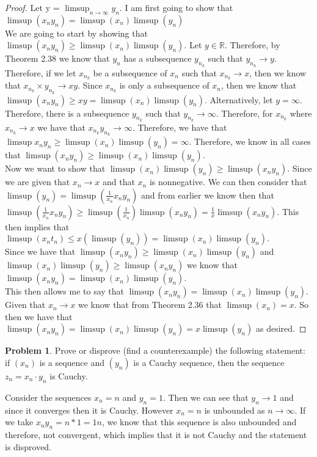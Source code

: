 \documentclass[11pt]{article}
\theoremstyle{definition}
\newtheorem{problem}{Problem}
\newcommand{\R}{\mathbb{R}}
\begin{document}
\begin{proof}
Let y = $\limsup_{n\to \infty}y_n$. I am first going to show that $\limsup(x_ny_n) = \limsup(x_n)\limsup(y_n)$\\
We are going to start by showing that $\limsup(x_ny_n) \geq \limsup(x_n) \limsup(y_n).$ Let $y \in \R$. Therefore, by Theorem 2.38 we know that $y_n$ has a subsequence $y_{n_k}$ such that $y_{n_k} \to y$. Therefore, if we let $x_{n_k}$ be a subsequence of $x_n$ such that $x_{n_k} \to x$, then we know that $x_{n_k}\times y_{n_k} \to xy$. Since $x_{n_k}$ is only a subsequence of $x_n$, then we know that $\limsup(x_ny_n) \geq xy = \limsup (x_n)\limsup(y_n)$. Alternatively, let $y = \infty.$ Therefore, there is a subsequence $y_{n_k}$ such that $y_{n_k} \to \infty.$ Therefore, for $x_{n_k}$ where $x_{n_k}\to x$ we have that $x_{n_k}y_{n_k} \to \infty.$ Therefore, we have that $\limsup x_ny_n \geq \limsup (x_n)\limsup (y_n) = \infty$. Therefore, we know in all cases that $\limsup(x_ny_n) \geq \limsup(x_n)\limsup(y_n).$\\
Now we want to show that $\limsup(x_n)\limsup(y_n)\geq \limsup(x_ny_n)$. Since we are given that $x_n \to x$ and that $x_n$ is nonnegative. We can then consider that $\limsup(y_n) = \limsup(\frac{1}{x_n}x_ny_n)$ and from earlier we know then that $\limsup(\frac{1}{x_n}x_ny_n) \geq \limsup(\frac{1}{x_n})\limsup(x_ny_n) = \frac{1}{x}\limsup(x_ny_n)$. This then implies that $\limsup (x_nt_n) \leq x(\limsup(y_n)) = \limsup(x_n)\limsup(y_n).$\\
Since we have that $\limsup(x_ny_n)\geq \limsup(x_n)\limsup(y_n)$ and $\limsup(x_n)\limsup(y_n)\geq \limsup(x_ny_n)$ we know that $\limsup(x_ny_n) = \limsup(x_n)\limsup(y_n).$\\
This then allows me to say that $\limsup(x_ny_n) = \limsup(x_n)\limsup(y_n).$ Given that $x_n \to x$ we know that from Theorem 2.36 that $\limsup(x_n) = x$. So then we have that $\limsup(x_ny_n) = \limsup(x_n)\limsup(y_n) = x\limsup(y_n)$ as desired.
\end{proof}

\newpage
\begin{problem}
Prove or disprove (find a counterexample) the following statement: 
if $(x_n)$ is a sequence and $(y_n)$ is a Cauchy sequence, 
then the sequence $z_n = x_n \cdot y_n$ is Cauchy. 
\end{problem}

Consider the sequences $x_n = n$ and $y_n = 1$. Then we can see that $y_n \to 1$ and since it converges then it is Cauchy. However $x_n = n$ is unbounded as $n\to \infty$. If we take $x_ny_n = n * 1 = 1n$, we know that this sequence is also unbounded and therefore, not convergent, which implies that it is not Cauchy and the statement is disproved.
\end{document}
